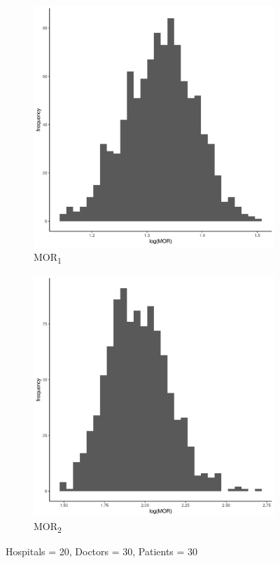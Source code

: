 \documentclass[
  letterpaper,
  DIV=11,
  numbers=noendperiod,
  titlepage]{scrartcl}
\begin{document}
\vspace{10mm}

\begin{figure}
\centering
\begin{subfigure}{.49\textwidth}
    \centering
    \includegraphics[width=.95\linewidth]{../../plots/three-lvl-ran-int/low-prev/hist_20_30_30_three_lvl_low_prev_mor1.png}  
    \caption{MOR\textsubscript{1}}
    \label{l20m30n301}
\end{subfigure}
\begin{subfigure}{.49\textwidth}
    \centering
    \includegraphics[width=.95\linewidth]{../../plots/three-lvl-ran-int/low-prev/hist_20_30_30_three_lvl_low_prev_mor2.png}
    \caption{MOR\textsubscript{2}}
    \label{l20m30n302}
\end{subfigure}
\caption{Hospitals = 20, Doctors = 30, Patients = 30}
\label{mor2}
\end{figure}
\end{document}
